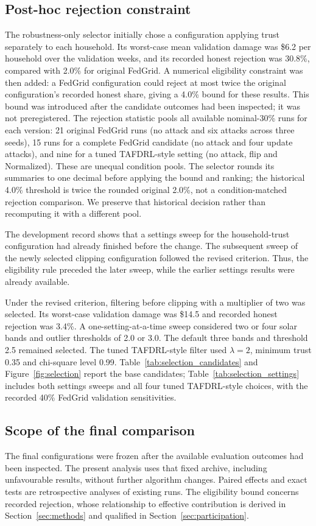 \subsection{Post-hoc rejection constraint}
The robustness-only selector initially chose a configuration applying trust separately to each household. Its worst-case mean validation damage was \$6.2 per household over the validation weeks, and its recorded honest rejection was 30.8\%, compared with 2.0\% for original FedGrid. A numerical eligibility constraint was then added: a FedGrid configuration could reject at most twice the original configuration's recorded honest share, giving a 4.0\% bound for these results. This bound was introduced after the candidate outcomes had been inspected; it was not preregistered. The rejection statistic pools all available nominal-30\% runs for each version: 21 original FedGrid runs (no attack and six attacks across three seeds), 15 runs for a complete FedGrid candidate (no attack and four update attacks), and nine for a tuned TAFDRL-style setting (no attack, flip and Normalized). These are unequal condition pools. The selector rounds its summaries to one decimal before applying the bound and ranking; the historical 4.0\% threshold is twice the rounded original 2.0\%, not a condition-matched rejection comparison. We preserve that historical decision rather than recomputing it with a different pool.

The development record shows that a settings sweep for the household-trust configuration had already finished before the change. The subsequent sweep of the newly selected clipping configuration followed the revised criterion. Thus, the eligibility rule preceded the later sweep, while the earlier settings results were already available.

Under the revised criterion, filtering before clipping with a multiplier of two was selected. Its worst-case validation damage was \$14.5 and recorded honest rejection was 3.4\%. A one-setting-at-a-time sweep considered two or four solar bands and outlier thresholds of 2.0 or 3.0. The default three bands and threshold 2.5 remained selected. The tuned TAFDRL-style filter used $\lambda=2$, minimum trust 0.35 and chi-square level 0.99. Table~\ref{tab:selection_candidates} and Figure~\ref{fig:selection} report the base candidates; Table~\ref{tab:selection_settings} includes both settings sweeps and all four tuned TAFDRL-style choices, with the recorded 40\% FedGrid validation sensitivities.

\subsection{Scope of the final comparison}
The final configurations were frozen after the available evaluation outcomes had been inspected. The present analysis uses that fixed archive, including unfavourable results, without further algorithm changes. Paired effects and exact tests are retrospective analyses of existing runs. The eligibility bound concerns recorded rejection, whose relationship to effective contribution is derived in Section~\ref{sec:methods} and qualified in Section~\ref{sec:participation}.
